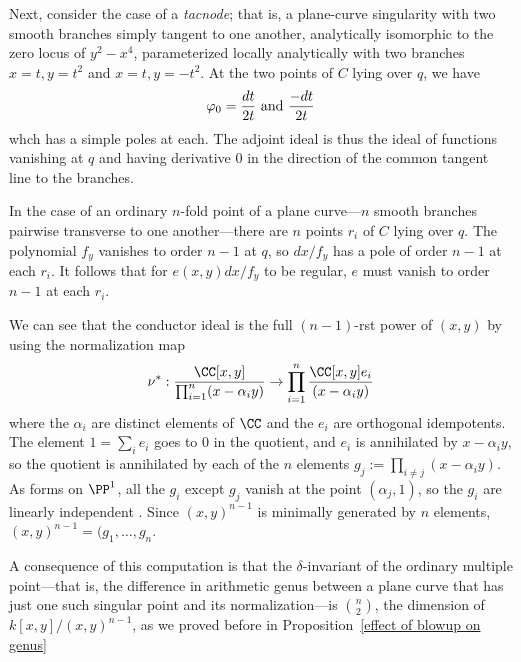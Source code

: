 \begin{example}[tacnodes]
Next, consider the case of a \emph{tacnode}; that is, a plane-curve singularity with two smooth branches simply tangent to one another, analytically isomorphic to the zero locus of $y^2-x^4$, parameterized locally analytically with two branches $x = t, y =  t^{2}$ and $x=t, y = -t^{2}$.
At the two points of $C$ lying over $q$, we have
  $$
 \varphi_0 =  \frac{dt}{ 2t} \hbox{ and } \frac{-dt}{ 2t}
 $$ 
whch has a simple poles at each. 
The adjoint ideal is thus the ideal of functions vanishing at $q$ and having derivative 0 in the direction of the common tangent line to the branches.
\end{example}

\begin{example}
In the case of an ordinary $n$-fold point of a plane curve---$n$ smooth branches pairwise transverse to one another---there are $n$ points
$r_i$ of $C$ lying over $q$. The polynomial $f_y$ vanishes to order $n-1$ at $q$, so $dx/f_y$ has a pole of order $n-1$ at
each $r_i$. It follows that for $e(x,y)dx/f_y$ to be regular, $e$ must vanish to order $n-1$ at each $r_i$. 

We can see that the conductor ideal is the full $(n-1)$-rst power of $(x,y)$ by using the
normalization map
$$
\nu^{*}: \frac{\CC[x,y]}{\prod_{i=1}^{n} (x-\alpha_{i}y)} \to
 \prod_{i=1}^{n} \frac{\CC[x,y]e_{i}}{(x-\alpha_{i}y)}
$$
where the $\alpha_{i}$ are distinct elements of $\CC$ and the $e_{i}$ are orthogonal idempotents.
The element $1 = \sum_{i}e_{i}$ goes to 0 in the quotient, and $e_{i}$ is annihilated by $x-\alpha_{i}y$,
so the quotient is annihilated by each of the $n$ elements $g_{j} := \prod_{i\neq j} (x-\alpha_{i}y)$.
As forms on $\PP^{1}$, all the $g_{i}$ except $g_{j}$ vanish at the 
point $(\alpha_{j}, 1)$, so the $g_{i}$ are linearly independent . Since $(x,y)^{n-1}$ is minimally generated by $n$ elements, $(x,y)^{n-1} = (g_{1}, \dots, g_{n}$.

A consequence of this computation is that the $\delta$-invariant of the ordinary multiple point---that is, the difference in arithmetic genus between a plane curve that has just one such singular point and its normalization---is $\binom{n}{2}$, the dimension of $k[x,y]/(x,y)^{n-1}$, as we proved before in Proposition~\ref{effect of blowup on genus} \end{example}

